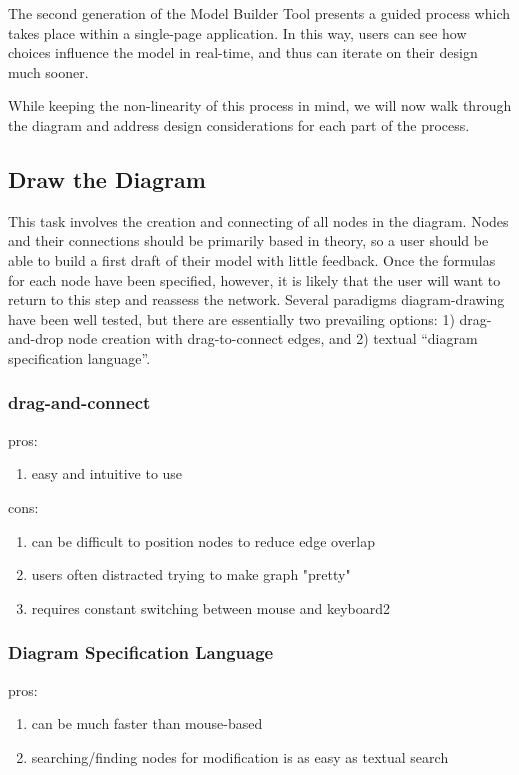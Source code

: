 The second generation of the Model Builder Tool presents a guided process which takes place within a single-page application. 
In this way, users can see how choices influence the model in real-time, and thus can iterate on their design much sooner.

While keeping the non-linearity of this process in mind, we will now walk through the diagram and address design considerations for each part of the process.

\subsection{Draw the Diagram}
This task involves the creation and connecting of all nodes in the diagram. 
Nodes and their connections should be primarily based in theory, so a user should be able to build a first draft of their model with little feedback. 
Once the formulas for each node have been specified, however, it is likely that the user will want to return to this step and reassess the network. 
Several paradigms diagram-drawing have been well tested, but there are essentially two prevailing options:
1) drag-and-drop node creation with drag-to-connect edges, and 2) textual ``diagram specification language''.

\subsubsection{drag-and-connect}
pros:
\begin{enumerate}
  \item{easy and intuitive to use}
\end{enumerate}
cons:
\begin{enumerate}
 \item can be difficult to position nodes to reduce edge overlap
 \item users often distracted trying to make graph "pretty"
 \item requires constant switching between mouse and keyboard2
\end{enumerate}

\subsubsection{Diagram Specification Language}
pros:
\begin{enumerate}
 \item can be much faster than mouse-based
 \item searching/finding nodes for modification is as easy as textual search
\end{enumerate}


